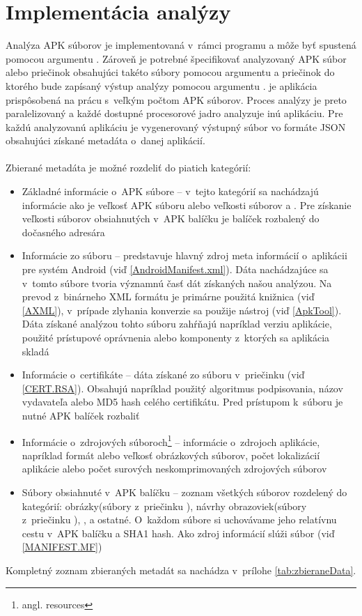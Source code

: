 \section{Implementácia analýzy}
Analýza APK súborov je implementovaná v~rámci programu  a môže byť spustená pomocou argumentu . Zároveň je potrebné špecifikovať analyzovaný APK súbor alebo priečinok obsahujúci takéto súbory pomocou argumentu  a priečinok do ktorého bude zapísaný výstup analýzy pomocou argumentu .  je aplikácia prispôsobená na prácu s~veľkým počtom APK súborov. Proces analýzy je preto paralelizovaný a každé dostupné procesorové jadro analyzuje inú aplikáciu. Pre každú analyzovanú aplikáciu je vygenerovaný výstupný súbor vo formáte JSON obsahujúci získané metadáta o~danej aplikácií. \\\\
Zbierané metadáta je možné rozdeliť do piatich kategórií:
\begin{itemize}
\item Základné informácie o~APK súbore -- v~tejto kategórií sa nachádzajú informácie ako je veľkosť APK súboru alebo veľkosti súborov  a . Pre získanie veľkosti súborov obsiahnutých v~APK balíčku je balíček rozbalený do dočasného adresára
\item Informácie zo súboru  --  predstavuje hlavný zdroj meta informácií o~aplikácii pre systém Android (viď \ref{AndroidManifest.xml}). Dáta nachádzajúce sa v~tomto súbore tvoria významnú časť dát získaných našou analýzou. Na prevod z~binárneho XML formátu je primárne použitá knižnica  (viď \ref{AXML}), v~prípade zlyhania konverzie sa použije  nástroj  (viď \ref{ApkTool}). Dáta získané analýzou tohto súboru zahŕňajú napríklad verziu aplikácie, použité prístupové oprávnenia alebo komponenty z~ktorých sa aplikácia skladá
\item Informácie o~certifikáte -- dáta získané zo súboru  v~priečinku  (viď \ref{CERT.RSA}). Obsahujú napríklad použitý algoritmus podpisovania, názov vydavateľa alebo MD5 hash celého certifikátu. Pred prístupom k~súboru  je nutné APK balíček rozbaliť
\item Informácie o~zdrojových súboroch\footnote{angl. resources} -- informácie o~zdrojoch aplikácie, napríklad formát alebo veľkosť obrázkových súborov, počet lokalizácií aplikácie alebo počet surových neskomprimovaných zdrojových súborov
\item Súbory obsiahnuté v~APK balíčku -- zoznam všetkých súborov rozdelený do kategórií: obrázky(súbory z~priečinku ), návrhy obrazoviek(súbory z~priečinku ), ,  a ostatné. O~každom súbore si uchovávame jeho relatívnu cestu v~APK balíčku a SHA1 hash. Ako zdroj informácií slúži súbor  (viď \ref{MANIFEST.MF})
\end{itemize}

\noindent Kompletný zoznam zbieraných metadát sa nachádza v~prílohe \ref{tab:zbieraneData}.